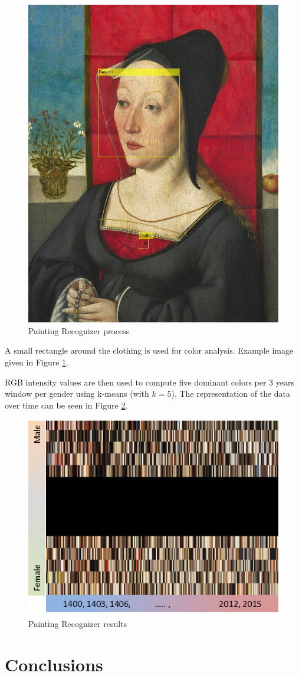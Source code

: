 \documentclass[runningheads]{llncs}
\newcommand{\longfillertext}{\textcolor{black!20}{\lipsum[5-13]}}
\begin{document}
\begin{figure}
	\centering
	\includegraphics[width=.5\textwidth]{PaintingRecognizer-matlab_results}
	\caption{Painting Recognizer process}
	\label{pr-process}	
\end{figure}

A small rectangle around the clothing is used for color analysis. Example image given in Figure \ref{pr-process}. 

RGB intensity values are then used to compute five dominant colors per 3 years window per gender using k-means (with $k=5$). The representation of the data over time can be seen in Figure \ref{pr-result}.

\begin{figure}
	\centering
	\includegraphics[width=.5\textwidth]{PaintingRecognizer-results}
	\caption{Painting Recognizer results}
	\label{pr-result}	
\end{figure}


\section{Conclusions}
\longfillertext
\clearpage



\end{document}
